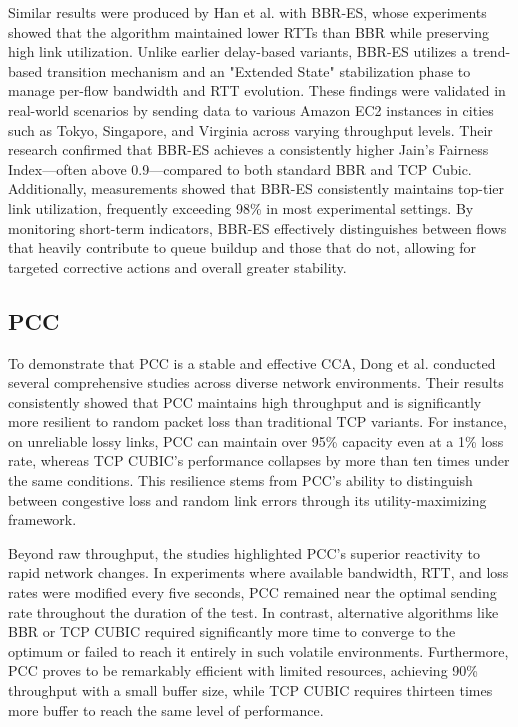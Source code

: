 Similar results were produced by Han et al. with BBR-ES, whose experiments showed that the algorithm maintained lower RTTs than BBR while preserving high link utilization. 
Unlike earlier delay-based variants, BBR-ES utilizes a trend-based transition mechanism and an "Extended State" stabilization phase to manage per-flow bandwidth and RTT evolution. 
These findings were validated in real-world scenarios by sending data to various Amazon EC2 instances in cities such as Tokyo, Singapore, and Virginia across varying throughput levels. 
Their research confirmed that BBR-ES achieves a consistently higher Jain's Fairness Index—often above 0.9—compared to both standard BBR and TCP Cubic. 
Additionally, measurements showed that BBR-ES consistently maintains top-tier link utilization, frequently exceeding 98\% in most experimental settings. 
By monitoring short-term indicators, BBR-ES effectively distinguishes between flows that heavily contribute to queue buildup and those that do not, allowing for targeted corrective actions and overall greater stability.

\subsection{PCC}

To demonstrate that PCC is a stable and effective \acs{CCA}, Dong et al. \cite{PCC} conducted several comprehensive studies across diverse network environments. 
Their results consistently showed that PCC maintains high throughput and is significantly more resilient to random packet loss than traditional TCP variants. 
For instance, on unreliable lossy links, PCC can maintain over 95\% capacity even at a 1\% loss rate\cite{PCC}, whereas TCP CUBIC's performance collapses by more than ten times under the same conditions\cite{PCCEVALUATION}. 
This resilience stems from PCC's ability to distinguish between congestive loss and random link errors through its utility-maximizing framework.  

Beyond raw throughput, the studies highlighted PCC's superior reactivity to rapid network changes. 
In experiments where available bandwidth, RTT, and loss rates were modified every five seconds, PCC remained near the optimal sending rate throughout the duration of the test\cite{PCC}. 
In contrast, alternative algorithms like BBR or TCP CUBIC required significantly more time to converge to the optimum or failed to reach it entirely in such volatile environments. 
Furthermore, PCC proves to be remarkably efficient with limited resources, achieving 90\% throughput with a small buffer size, while TCP CUBIC requires thirteen times more buffer to reach the same level of performance\cite{PCCEVALUATION}. 

